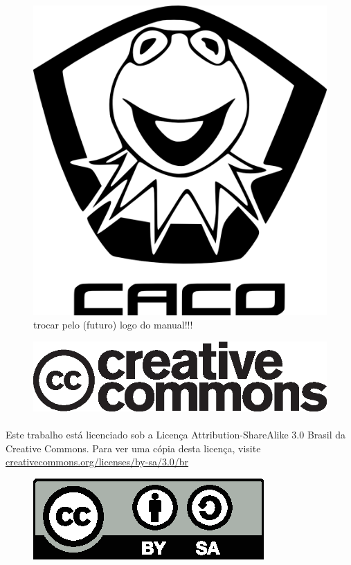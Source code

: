 \documentclass[a4paper,10pt,twocolumn]{book}
\begin{document}


\frontmatter
\onecolumn
\begin{figure}[H]
    \vskip 50pt %
    \centering
    \includegraphics[width=.65\textwidth]{img/caco/logo.png}
    \caption{trocar pelo (futuro) logo do manual!!!}
\end{figure}

\vfill %

\begin{figure}[H]
    \centering
    \includegraphics[width=.5\textwidth]{img/cc-logo.eps}
\end{figure}

\paragraph{}
Este trabalho está licenciado sob a Licença Attribution-ShareAlike 3.0 Brasil da
Creative Commons. Para ver uma cópia desta licença, visite
\url{creativecommons.org/licenses/by-sa/3.0/br}

\begin{figure}[H]
    \centering
    \includegraphics[scale=.8]{img/by-sa.eps}
\end{figure}
\end{document}
